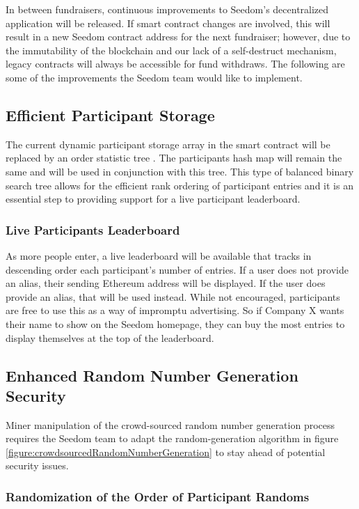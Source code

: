 \documentclass[11pt]{article}
\begin{document}
In between fundraisers, continuous improvements to Seedom's decentralized application will be released. If smart contract changes are involved, this will result in a new Seedom contract address for the next fundraiser; however, due to the immutability of the blockchain and our lack of a self-destruct mechanism, legacy contracts will always be accessible for fund withdraws. The following are some of the improvements the Seedom team would like to implement.

\subsection{Efficient Participant Storage}

The current dynamic participant storage array in the smart contract will be replaced by an order statistic tree \cite{5}. The participants hash map will remain the same and will be used in conjunction with this tree. This type of balanced binary search tree allows for the efficient rank ordering of participant entries and it is an essential step to providing support for a live participant leaderboard.

\subsubsection{Live Participants Leaderboard}

As more people enter, a live leaderboard will be available that tracks in descending order each participant's number of entries. If a user does not provide an alias, their sending Ethereum address will be displayed. If the user does provide an alias, that will be used instead. While not encouraged, participants are free to use this as a way of impromptu advertising. So if Company X wants their name to show on the Seedom homepage, they can buy the most entries to display themselves at the top of the leaderboard.

\subsection{Enhanced Random Number Generation Security}

Miner manipulation of the crowd-sourced random number generation process requires the Seedom team to adapt the random-generation algorithm in figure \ref{figure:crowdsourcedRandomNumberGeneration} to stay ahead of potential security issues.

\subsubsection{Randomization of the Order of Participant Randoms}
\end{document}
